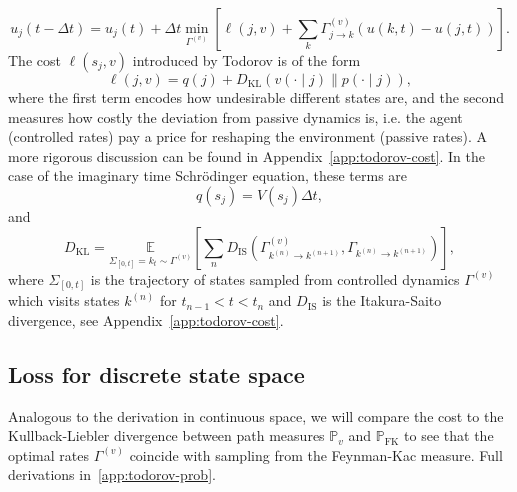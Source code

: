 \begin{equation}
	u_{j}(t-\Delta t)=u_{j}(t)+\Delta t \min _{\Gamma^{(v)}}\left[\ell(j, v)+\sum_{k} \Gamma_{j \rightarrow k}^{(v)}(u(k, t)-u(j, t))\right].
\end{equation}
The cost $\ell(s_j, v)$ introduced by Todorov is of the form
\begin{equation}
	\ell(j, v)=q(j)+D_{\mathrm{KL}}(v(\cdot \mid j) \| p(\cdot \mid j)),
\end{equation}
where the first term encodes how undesirable different states are, and the second measures how costly the deviation from passive dynamics is, i.e. the agent (controlled rates) pay a price for reshaping the environment (passive rates). A more rigorous discussion can be found in Appendix~\ref{app:todorov-cost}. In the case of the imaginary time Schr\" odinger equation, these terms are
\begin{equation}
	q(s_j)=V(s_j) \Delta t,
\end{equation}
and
\begin{equation}
	D_{\mathrm{KL}}=\underset{\Sigma_{[0, t]} = k_t \sim \Gamma^{(v)}}{\mathbb{E}}\left[\sum_{n} D_{\mathrm{IS}}\left(\Gamma_{k^{(n)} \rightarrow k^{(n+1)}}^{(v)}, \Gamma_{k^{(n)} \rightarrow k^{(n+1)}}\right)\right],
\end{equation}
where $\Sigma_{[0, t]}$ is the trajectory of states sampled from controlled dynamics $\Gamma^{(v)}$  which visits states $k^{(n)}$ for $t_{n-1} < t < t_{n}$ and $D_{\mathrm{IS}}$ is the Itakura-Saito divergence, see Appendix~\ref{app:todorov-cost}.

\subsection{Loss for discrete state space}
\label{subsec:discrete_loss}
Analogous to the derivation in continuous space, we will compare the cost to the Kullback-Liebler divergence between path measures $\mathbb{P}_v$ and $\mathbb{P}_{\mathrm{FK}}$ to see that the optimal rates $\Gamma^{(v)}$ coincide with sampling from the Feynman-Kac measure. Full derivations in~\ref{app:todorov-prob}.

